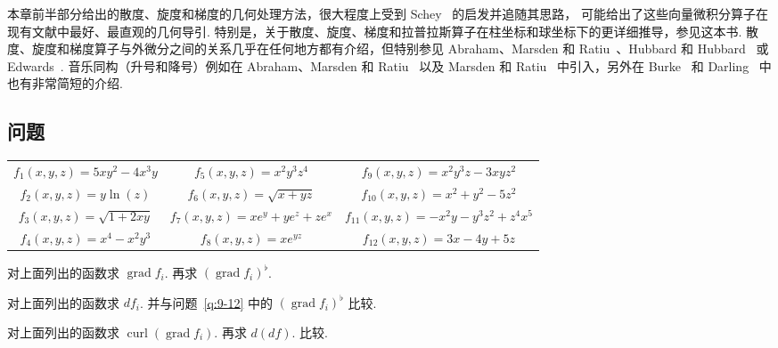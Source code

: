 本章前半部分给出的散度、旋度和梯度的几何处理方法，很大程度上受到 Schey~\cite{ref38} 的启发并追随其思路，\cite{ref38} 可能给出了这些向量微积分算子在现有文献中最好、最直观的几何导引. 特别是，关于散度、旋度、梯度和拉普拉斯算子在柱坐标和球坐标下的更详细推导，参见这本书. 散度、旋度和梯度算子与外微分之间的关系几乎在任何地方都有介绍，但特别参见 Abraham、Marsden 和 Ratiu~\cite{ref01}、Hubbard 和 Hubbard~\cite{ref27} 或 Edwards~\cite{ref18}. 音乐同构（升号和降号）例如在 Abraham、Marsden 和 Ratiu~\cite{ref01} 以及 Marsden 和 Ratiu~\cite{ref32} 中引入，另外在 Burke~\cite{ref08} 和 Darling~\cite{ref12} 中也有非常简短的介绍.

\subsection{问题}

\begin{center}
\small
\begin{tabular}{ccc}
$f_1(x,y,z)=5xy^2-4x^3y$ & $f_5(x,y,z)=x^2y^3z^4$ & $f_9(x,y,z)=x^2y^3z-3xyz^2$\\[3pt]
$f_2(x,y,z)=y\ln(z)$ & $f_6(x,y,z)=\sqrt{x+yz}$ & $f_{10}(x,y,z)=x^2+y^2-5z^2$\\[3pt]
$f_3(x,y,z)=\sqrt{1+2xy}$ & $f_7(x,y,z)=xe^y+ye^z+ze^x$ & $f_{11}(x,y,z)=-x^2y-y^3z^2+z^4x^5$\\[3pt]
$f_4(x,y,z)=x^4-x^2y^3$ & $f_8(x,y,z)=xe^{yz}$ & $f_{12}(x,y,z)=3x-4y+5z$
\end{tabular}
\end{center}

\begin{question}\label{q:9-12}
对上面列出的函数求 $\operatorname{grad}f_i$. 再求 $(\operatorname{grad}f_i)^{\flat}$.
\end{question}

\begin{question}\label{q:9-13}
对上面列出的函数求 $df_i$. 并与问题~\ref{q:9-12} 中的 $(\operatorname{grad}f_i)^{\flat}$ 比较.
\end{question}

\begin{question}\label{q:9-14}
对上面列出的函数求 $\operatorname{curl}(\operatorname{grad}f_i)$. 再求 $d(df)$. 比较.
\end{question}

